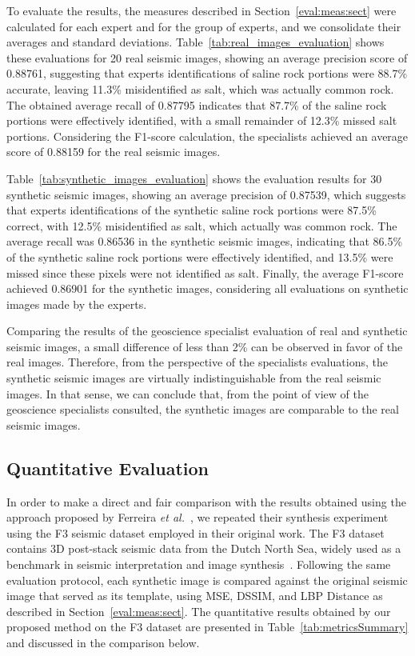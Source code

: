 \documentclass{ieeeaccess}
\begin{document}
To evaluate the results, the measures described in Section~\ref{eval:meas:sect} were calculated for each expert and for the group of experts, and we consolidate their averages and standard deviations. Table~\ref{tab:real_images_evaluation} shows these evaluations for 20 real seismic images, showing an average precision score of 0.88761, suggesting that experts identifications of saline rock portions were 88.7\% accurate, leaving 11.3\% misidentified as salt, which was actually common rock. The obtained average recall of 0.87795 indicates that 87.7\% of the saline rock portions were effectively identified, with a small remainder of 12.3\% missed salt portions. Considering the F1-score calculation, the specialists achieved an average score of 0.88159 for the real seismic images.

Table~\ref{tab:synthetic_images_evaluation} shows the evaluation  results for 30 synthetic seismic images, showing an average precision of 0.87539, which suggests that experts identifications of the synthetic saline rock portions were 87.5\% correct, with 12.5\% misidentified as salt, which actually was common rock. The average recall was 0.86536 in the synthetic seismic images, indicating that 86.5\% of the synthetic saline rock portions were effectively identified, and 13.5\% were missed since these pixels were not identified as salt. Finally, the average F1-score achieved 0.86901 for the synthetic images, considering all evaluations on synthetic images made by the experts.

Comparing the results of the geoscience specialist evaluation of real and synthetic seismic images, a small difference of less than 2\% can be observed in favor of the real images. Therefore, from the perspective of the specialists evaluations, the synthetic seismic images are virtually indistinguishable from the real seismic images. In that sense, we can conclude that, from the point of view of the geoscience specialists consulted, the synthetic images are comparable to the real seismic images.

\subsection{Quantitative Evaluation}

In order to make a direct and fair comparison with the results obtained using the approach proposed by Ferreira \emph{et al.}~\cite{Ferreira2020}, we repeated their synthesis experiment using the F3 seismic dataset employed in their original work. The F3 dataset contains 3D post-stack seismic data from the Dutch North Sea, widely used as a benchmark in seismic interpretation and image synthesis~\cite{Baroni2018}. Following the same evaluation protocol, each synthetic image is compared against the original seismic image that served as its template, using MSE, DSSIM, and LBP Distance as described in Section~\ref{eval:meas:sect}. The quantitative results obtained by our proposed method on the F3 dataset are presented in Table~\ref{tab:metricsSummary} and discussed in the comparison below.
\end{document}
